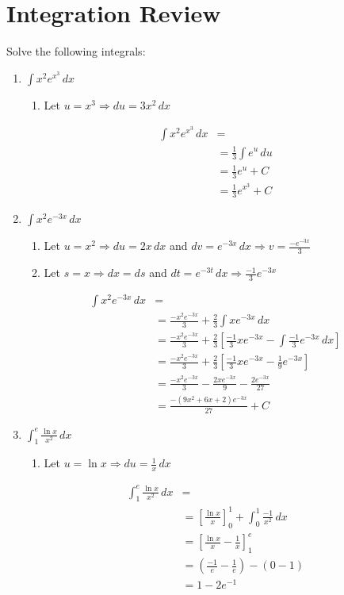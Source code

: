\documentclass[letter,11pt]{article}
\begin{document}
\section*{Integration Review}
Solve the following integrals: 
\begin{enumerate}[label=\roman*.]
    \item $\int x^2 e^{x^3} \, dx$
        \begin{enumerate}
            \item Let $u=x^3 \Longrightarrow du = 3x^2 \, dx$
        \end{enumerate}
       \begin{align*}
           \int x^2 e^{x^3} \, dx &= \\
           &= \frac{1}{3}\int e^{u} \, du \\
           &= \frac{1}{3}e^u + C\\
           &= \boxed{\frac{1}{3}e^{x^3} + C}
       \end{align*}
    \item $\int x^2 e^{-3x} \, dx$
        \begin{enumerate}
            \item Let $u=x^2 \Longrightarrow du = 2x \, dx$ and $dv = e^{-3x} \,dx \Longrightarrow v = \frac{-e^{-3x}}{3}$
            \item Let $s=x \Longrightarrow dx =ds$ and $dt = e^{-3t} \, dx \Longrightarrow \frac{-1}{3}e^{-3x}$
        \end{enumerate}
        \begin{align*}
            \int x^2 e^{-3x} \, dx & = \\
           &= \frac{-x^2e^{-3x}}{3} + \frac{2}{3} \int xe^{-3x}\, dx \\ 
           &= \frac{-x^2e^{-3x}}{3} + \frac{2}{3} \left[\frac{-1}{3}xe^{-3x} -\int \frac{-1}{3} e^{-3x} \, dx \right] \\
           &= \frac{-x^2e^{-3x}}{3} + \frac{2}{3} \left[\frac{-1}{3}xe^{-3x} - \frac{1}{9} e^{-3x} \right]\\
           & = \frac{-x^2e^{-3x}}{3} - \frac{2xe^{-3x}}{9}-\frac{2e^{-3x}}{27}\\
           &= \boxed{\frac{-(9x^2+6x+2)e^{-3x}}{27}+C}
        \end{align*}
    \item $\int_{1}^{e} \frac{\ln x}{x^2} \, dx$
        \begin{enumerate}
            \item Let $u=\ln x \Longrightarrow du = \frac{1}{x} \, dx$
        \end{enumerate}
        \begin{align*}
            \int_{1}^{e} \frac{\ln x}{x^2} \, dx &=\\
            &= \left[\frac{\ln x}{x}\right]_{0}^{1} + \int_{0}^{1}  \frac{-1}{x^2} \, dx \\
            &= \left[\frac{\ln x}{x} - \frac{1}{x}\right]_{1}^{e} \\ 
            &= \left(\frac{-1}{e}-\frac{1}{e}\right) - (0-1)\\
            &= \boxed{1-2e^{-1}}
        \end{align*}
        

\end{enumerate}
\end{document}
